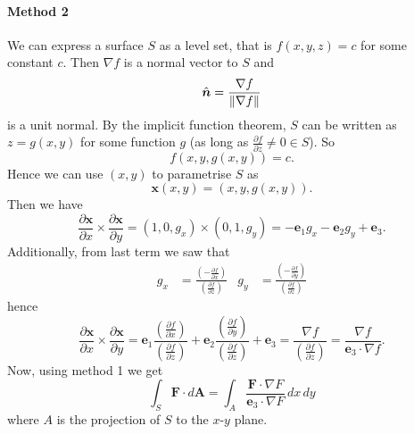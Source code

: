 \paragraph{Method 2}

We can express a surface $S$ as a level set, that is $f(x, y, z) = c$
for some constant $c$.
Then $\nabla f$ is a normal vector to $S$ and
\[
    \hat{\bm n} = \frac{\nabla f}{\left\lVert\nabla f\right\rVert}
\]
is a unit normal.
By the implicit function theorem, $S$ can be written as 
$z = g(x, y)$
for some function $g$
(as long as $\frac{\partial f}{\partial z} \neq 0 \in S$).
So
\[
    f(x, y, g(x,y)) = c.
\]
Hence we can use $(x,y)$ to parametrise $S$ as
\[
    \bm x(x, y) = (x, y, g(x, y)).
\]
Then we have
\[
    \frac{\partial \bm x}{\partial x} \times \frac{\partial \bm x}{\partial y}
    = (1, 0, g_x) \times (0, 1, g_y) = -\bm e_1 g_x - \bm e_2 g_y + \bm e_3.
\]
Additionally, from last term we saw that
\begin{align*}
    g_x &= \frac{
        \left(
            - \frac{\partial f}{\partial x} 
        \right)}{
        \left(
            \frac{\partial f}{\partial z}
        \right)} &
    g_y &= \frac{
        \left(
            - \frac{\partial f}{\partial y} 
        \right)}{
        \left(
            \frac{\partial f}{\partial z}
        \right)} 
\end{align*}
hence
\[
    \frac{\partial \bm x}{\partial x} \times \frac{\partial \bm x}{\partial y}
    = \bm e_1 \frac{
            \left(
                \frac{\partial f}{\partial x}
            \right)}{
            \left(
                \frac{\partial f}{\partial z}
            \right)}
    + \bm e_2 \frac{
            \left(
                \frac{\partial f}{\partial y}
            \right)}{
            \left(
                \frac{\partial f}{\partial z}
            \right)}
    + \bm e_3
    = \frac{\nabla f}{\left(\frac{\partial f}{\partial z}\right)}
    = \frac{\nabla f}{\bm e_3 \cdot \nabla f}.
\]
Now, using method 1 we get
\[
    \int_S \bm F \cdot d \bm A 
    = \int_A \frac{\bm F \cdot \nabla F}{\bm e_3 \cdot \nabla F} \,dx\,dy
\]
where $A$ is the projection of $S$ to the $x$-$y$ plane.
